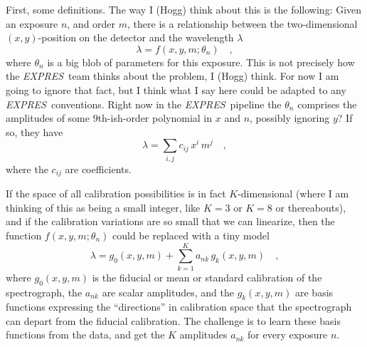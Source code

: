 \documentclass[12pt, letterpaper]{article}
\newcommand{\project}[1]{\textsl{#1}}
\newcommand{\acronym}[1]{{\small{#1}}}
\newcommand{\expres}{\project{\acronym{EXPRES}}}
\begin{document}
First, some definitions.
The way I (Hogg) think about this is the following:
Given an exposure $n$, and order $m$, there is a relationship between
the two-dimensional $(x,y)$-position on the detector and the
wavelength $\lambda$
\begin{equation}
\lambda = f(x,y,m;\theta_{n})
\quad ,
\end{equation}
where $\theta_{n}$ is a big blob of parameters for this exposure.
This is not precisely how the \expres\ team thinks about the problem,
I (Hogg) think.
For now I am going to ignore that fact, but I think what I say here
could be adapted to any \expres\ conventions.
Right now in the \expres\ pipeline the $\theta_{n}$ comprises the
amplitudes of some 9th-ish-order polynomial in $x$ and $n$, possibly
ignoring $y$?
If so, they have
\begin{equation}
\lambda = \sum_{i,j} c_{ij}\, x^i\,m^j
\quad ,
\end{equation}
where the $c_{ij}$ are coefficients.

If the space of all calibration possibilities is in fact
$K$-dimensional (where I am thinking of this as being a small integer,
like $K=3$ or $K=8$ or thereabouts), and if the calibration variations are so
small that we can linearize, then the function $f(x,y,m;\theta_{n})$ could
be replaced with a tiny model
\begin{equation}
\lambda = g_0(x,y,m) + \sum_{k=1}^K a_{nk}\,g_k(x,y,m)
\quad ,
\end{equation}
where
$g_0(x,y,m)$ is the fiducial or mean or standard calibration of the
spectrograph,
the $a_{nk}$ are scalar amplitudes,
and the $g_k(x,y,m)$ are basis functions expressing the ``directions''
in calibration space that the spectrograph can depart from the
fiducial calibration.
The challenge is to learn these basis functions from the data, and get
the $K$ amplitudes $a_{nk}$ for every exposure $n$.
\end{document}
